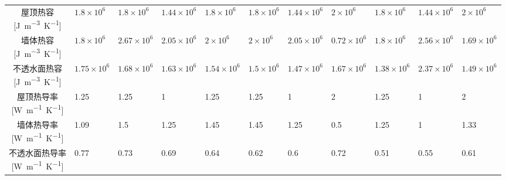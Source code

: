 \begin{landscape}
\begin{table}[htbp]
\begin{tabular}{@{}cllllllllll@{}}
      \makecell{屋顶热容       \\ {[\unit{J.m^{-3}.K^{-1}}]}} & $ 1.8\times 10^{6}$  & $ 1.8\times 10^{6}$  & $1.44\times 10^{6}$ & $ 1.8\times 10^{6}$ & $ 1.8\times 10^{6}$ & $ 1.44\times 10^{6}$ & $ 2\times 10^{6}$    & $1.8\times 10^{6}$  & $1.44\times 10^{6}$   & $ 2\times 10^{6}$    \\
      \makecell{墙体热容       \\ {[\unit{J.m^{-3}.K^{-1}}]}} & $ 1.8\times 10^{6}$  & $ 2.67\times 10^{6}$ & $2.05\times 10^{6}$ & $ 2\times 10^{6}$   & $ 2\times 10^{6}$   & $ 2.05\times 10^{6}$ & $ 0.72\times 10^{6}$ & $1.8\times 10^{6}$  & $ 2.56\times 10^{6}$  & $ 1.69\times 10^{6}$ \\
      \makecell{不透水面热容   \\ {[\unit{J.m^{-3}.K^{-1}}]}} & $ 1.75\times 10^{6}$ & $ 1.68\times 10^{6}$ & $1.63\times 10^{6}$ & $1.54\times 10^{6}$ & $1.5\times 10^{6}$  & $ 1.47\times 10^{6}$ & $ 1.67\times 10^{6}$ & $1.38\times 10^{6}$ & $ 2.37\times 10^{6}$  & $1.49\times 10^{6}$  \\
      \makecell{屋顶热导率     \\ {[\unit{W.m^{-1}.K^{-1}}]}} & 1.25                 & 1.25                 & 1                   & 1.25                & 1.25                & 1                    & 2                    & 1.25                & 1                     & 2                    \\
      \makecell{墙体热导率     \\ {[\unit{W.m^{-1}.K^{-1}}]}} & 1.09                 & 1.5                  & 1.25                & 1.45                & 1.45                & 1.25                 & 0.5                  & 1.25                & 1                     & 1.33                 \\
      \makecell{不透水面热导率 \\ {[\unit{W.m^{-1}.K^{-1}}]}} & 0.77                 & 0.73                 & 0.69                & 0.64                & 0.62                & 0.6                  & 0.72                 & 0.51                & 0.55                  & 0.61                 \\ \bottomrule
    \end{tabular}
  \end{table}
\end{landscape}

